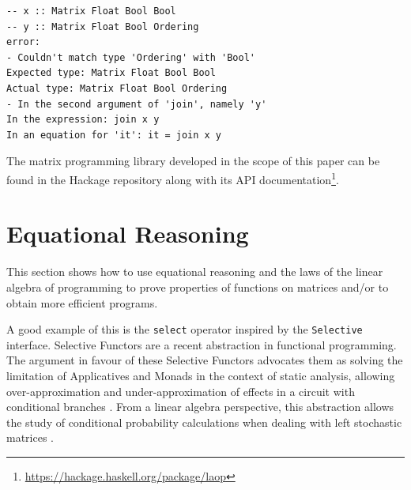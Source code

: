 \documentclass[sigplan,screen]{acmart}
\newcommand{\hs}{\texttt}
\def\start{&&}
\def\just#1#2{\\ &#1& \rule{2em}{0pt} \{ \mbox{\rule[-.7em]{0pt}{1.8em} \small #2 \/} \} \nonumber\\ && }
\begin{document}
\begin{verbatim}
-- x :: Matrix Float Bool Bool
-- y :: Matrix Float Bool Ordering
error:
- Couldn't match type 'Ordering' with 'Bool'
Expected type: Matrix Float Bool Bool
Actual type: Matrix Float Bool Ordering
- In the second argument of 'join', namely 'y'
In the expression: join x y
In an equation for 'it': it = join x y
\end{verbatim}

The matrix programming library developed in the scope of this paper can be found in the Hackage repository along with its API documentation\footnote{
\url{https://hackage.haskell.org/package/laop}}.

\section{Equational Reasoning}\label{sec-eq-reas}

This section shows how to use equational reasoning and the laws of the linear algebra of programming to prove properties of functions on matrices and/or to obtain more efficient programs.

A good example of this is the \hs{select} operator inspired by the \hs{Selective} interface. Selective Functors are a recent abstraction in functional programming. The argument in favour of these Selective Functors advocates them as solving the limitation of Applicatives and Monads in the context of static analysis, allowing over-approximation and under-approximation of effects in a circuit with conditional branches \cite{andrey2019selective}. From a linear algebra perspective, this abstraction allows the study of conditional probability calculations when dealing with left stochastic matrices \cite{Armando2020}. 
\end{document}
